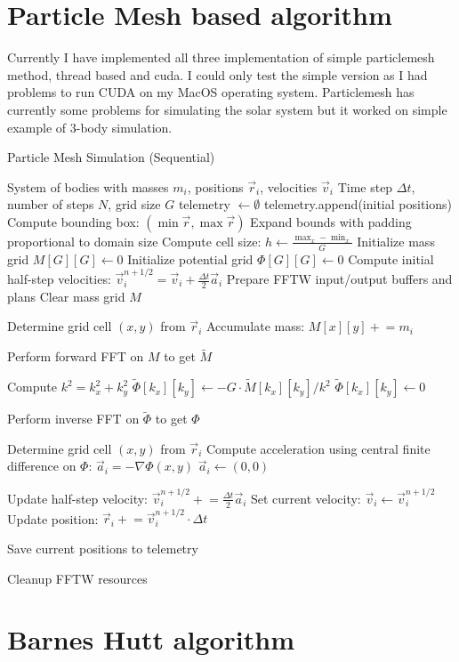 \documentclass{article}
\begin{document}
\section{Particle Mesh based algorithm}
Currently I have implemented all three implementation of simple particlemesh method, thread based and cuda. I could only test the simple version as I had problems to run CUDA on my MacOS operating system. Particlemesh has currently some problems for simulating the solar system but it worked on simple example of 3-body simulation. 
\begin{algorithm}[H]
\caption{Particle Mesh Simulation (Sequential)}\label{alg:partmesh}
\begin{algorithmic}[1]
\Require System of bodies with masses $m_i$, positions $\vec{r}_i$, velocities $\vec{v}_i$
\Require Time step $\Delta t$, number of steps $N$, grid size $G$
\State telemetry $\gets \emptyset$
\State telemetry.append(initial positions)
\State Compute bounding box: $(\min \vec{r}, \max \vec{r})$
\State Expand bounds with padding proportional to domain size
\State Compute cell size: $h \gets \frac{\max_x - \min_x}{G}$
\State Initialize mass grid $M[G][G] \gets 0$
\State Initialize potential grid $\Phi[G][G] \gets 0$
\State Compute initial half-step velocities: $\vec{v}_i^{n+1/2} = \vec{v}_i + \frac{\Delta t}{2} \vec{a}_i$
\State Prepare FFTW input/output buffers and plans
    \State Clear mass grid $M$
    
        \State Determine grid cell $(x, y)$ from $\vec{r}_i$
        \State Accumulate mass: $M[x][y] \mathrel{+}= m_i$
    \EndFor

    \State Perform forward FFT on $M$ to get $\tilde{M}$
    
        \State Compute $k^2 = k_x^2 + k_y^2$
            \State $\tilde{\Phi}[k_x][k_y] \gets -G \cdot \tilde{M}[k_x][k_y] / k^2$
        \Else
            \State $\tilde{\Phi}[k_x][k_y] \gets 0$
        \EndIf
    \EndFor

    \State Perform inverse FFT on $\tilde{\Phi}$ to get $\Phi$

        \State Determine grid cell $(x, y)$ from $\vec{r}_i$
            \State Compute acceleration using central finite difference on $\Phi$:
            \State $\vec{a}_i = -\nabla \Phi(x, y)$
        \Else
            \State $\vec{a}_i \gets (0, 0)$
        \EndIf
    \EndFor

        \State Update half-step velocity: $\vec{v}_i^{n+1/2} \mathrel{+}= \frac{\Delta t}{2} \vec{a}_i$
        \State Set current velocity: $\vec{v}_i \gets \vec{v}_i^{n+1/2}$
        \State Update position: $\vec{r}_i \mathrel{+}= \vec{v}_i^{n+1/2} \cdot \Delta t$
    \EndFor

    \State Save current positions to telemetry
\EndFor

\State Cleanup FFTW resources
\end{algorithmic}
\end{algorithm}
\section{Barnes Hutt algorithm}
\end{document}

